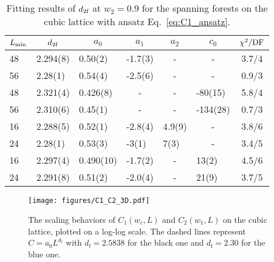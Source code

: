 \begin{table}[h]
\centering
\vspace{3ex}
\caption{Fitting results of ${d_{2\textrm{f}}}$ at $w_2 = 0.9$ for the spanning forests on the cubic lattice with ansatz Eq.~\eqref{eq:C1_ansatz}.}
\label{tab:C2_w1_3D} 
\begin{tabular}{|llllllc|}
\hline 
$L_{\rm min}$   &\multicolumn{1}{c}{${d_{2\textrm{f}}}$}   &\multicolumn{1}{c}{$a_0$}    
&\multicolumn{1}{c}{$a_1$}  &\multicolumn{1}{c}{$a_2$} &\multicolumn{1}{c}{$c_0$}
& $\chi^2/{\rm DF}$     \\
\hline 
48    &2.294(8)     &0.50(2)    &-1.7(3)    &\multicolumn{1}{c}{-} &\multicolumn{1}{c}{-} &3.7/4\\ 
56    &2.28(1)      &0.54(4)    &-2.5(6)    &\multicolumn{1}{c}{-} &\multicolumn{1}{c}{-} &0.9/3\\ 

48    &2.321(4)     &0.426(8)   &\multicolumn{1}{c}{-} &\multicolumn{1}{c}{-}      &-80(15)    &5.8/4\\ 
56    &2.310(6)     &0.45(1)    &\multicolumn{1}{c}{-} &\multicolumn{1}{c}{-}      &-134(28)   &0.7/3\\ 

16    &2.288(5)     &0.52(1)    &-2.8(4)    &4.9(9)     &\multicolumn{1}{c}{-}      &3.8/6\\ 
24    &2.28(1)      &0.53(3)    &-3(1)      &7(3)       &\multicolumn{1}{c}{-}      &3.4/5\\ 

16    &2.297(4)     &0.490(10)  &-1.7(2)    &\multicolumn{1}{c}{-}       &13(2)      &4.5/6\\ 
24    &2.291(8)     &0.51(2)    &-2.0(4)    &\multicolumn{1}{c}{-}       &21(9)      &3.7/5\\ 
\hline 
\end{tabular} 
\vspace{3ex}
\end{table} 

\begin{figure}[t]
	\centering
	\texttt{[image: figures/C1\_C2\_3D.pdf]}
	\caption{The scaling behaviors of $C_1(w_c, L)$ and $C_2(w_1, L)$ on the cubic lattice, plotted on a log-log scale. The dashed lines
	represent $C = a_0 L^{d_{\text{f}}}$ with $d_\text{f} = 2.5838$ for the black one and $d_{\text{f}} =2.30$ for the blue one.}
	\label{fig:C1_C2_3D}
\end{figure}


